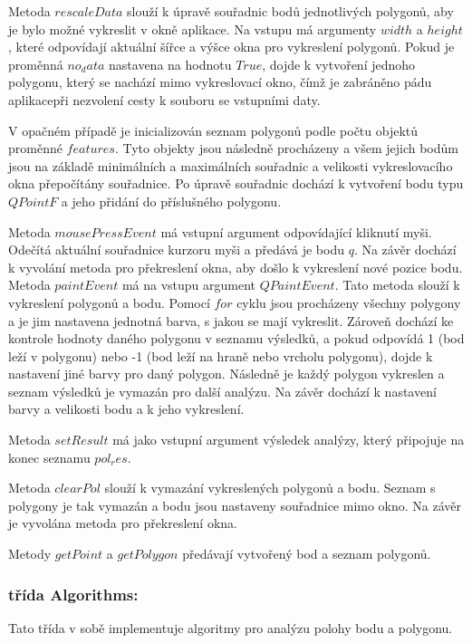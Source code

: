 \documentclass[15pt]{article}
\begin{document}
\begin{spacing}{1.5}
\noindent Metoda $rescaleData$ slouží k úpravě souřadnic bodů jednotlivých polygonů, aby je bylo možné vykreslit v okně aplikace. Na vstupu má argumenty $width$ a $height$, které odpovídají aktuální šířce a výšce okna pro vykreslení polygonů. Pokud je proměnná $no_data$ nastavena na hodnotu $True$, dojde k vytvoření jednoho polygonu, který se nachází mimo vykreslovací okno, čímž je zabráněno pádu aplikacepři nezvolení cesty k souboru se vstupními daty. 

V opačném případě je inicializován seznam polygonů podle počtu objektů proměnné $features$. Tyto objekty jsou následně procházeny a všem jejich bodům jsou na základě minimálních a maximálních souřadnic a velikosti vykreslovacího okna přepočítány souřadnice. Po úpravě souřadnic dochází k vytvoření bodu typu $QPointF$ a jeho přidání do příslušného polygonu.

\noindent Metoda $mousePressEvent$ má vstupní argument odpovídající kliknutí myši. Odečítá aktuální souřadnice kurzoru myši a předává je bodu $q$. Na závěr dochází k vyvolání metoda pro překreslení okna, aby došlo k vykreslení nové pozice bodu.
\noindent Metoda $paintEvent$ má na vstupu argument $QPaintEvent$. Tato metoda slouží k vykreslení polygonů a bodu. Pomocí $for$ cyklu jsou procházeny všechny polygony a je jim nastavena jednotná barva, s jakou se mají vykreslit. Zároveň dochází ke kontrole hodnoty daného polygonu v seznamu výsledků, a pokud odpovídá 1 (bod leží v polygonu) nebo -1 (bod leží na hraně nebo vrcholu polygonu), dojde k nastavení jiné barvy pro daný polygon. Následně je každý polygon vykreslen a seznam výsledků je vymazán pro další analýzu. Na závěr dochází k nastavení barvy a velikosti bodu a k jeho vykreslení.

\noindent Metoda $setResult$ má jako vstupní argument výsledek analýzy, který připojuje na konec seznamu $pol_res$.

\noindent Metoda $clearPol$ slouží k vymazání vykreslených polygonů a bodu. Seznam s polygony je tak vymazán a bodu jsou nastaveny souřadnice mimo okno. Na závěr je vyvolána metoda pro překreslení okna.

\noindent Metody $getPoint$ a $getPolygon$ předávají vytvořený bod a seznam polygonů.

\subsubsection*{třída Algorithms:}
Tato třída v sobě implementuje algoritmy pro analýzu polohy bodu a polygonu.


\end{spacing}
\end{document}
